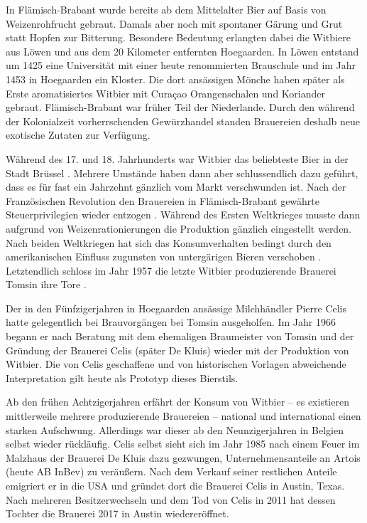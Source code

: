 \documentclass[a4paper,parskip=half]{scrartcl}
\begin{document}
In Flämisch-Brabant wurde bereits ab dem Mittelalter Bier auf
Basis von Weizenrohfrucht gebraut. Damals aber noch mit
spontaner Gärung und Grut statt Hopfen zur Bitterung.
Besondere Bedeutung erlangten dabei die Witbiere aus Löwen
und aus dem 20 Kilometer entfernten Hoegaarden. In Löwen
entstand um 1425 eine Universität mit einer heute renommierten Brauschule
und im Jahr 1453 in Hoegaarden ein Kloster. Die dort ansässigen
Mönche haben später als Erste aromatisiertes Witbier mit
Curaçao Orangenschalen und Koriander gebraut. Flämisch-Brabant war
früher Teil der Niederlande. Durch den während der
Kolonialzeit vorherrschenden Gewürzhandel standen
Brauereien deshalb neue exotische Zutaten zur Verfügung.
\parencite[1,4]{Strottner1999}

Während des 17. und 18. Jahrhunderts war Witbier das beliebteste Bier
in der Stadt Brüssel \parencite{Zainasheff2007}.
Mehrere Umstände haben dann aber schlussendlich dazu geführt, dass
es für fast ein Jahrzehnt gänzlich vom Markt verschwunden ist.
Nach der Französischen Revolution den Brauereien in
Flämisch-Brabant gewährte Steuerprivilegien wieder entzogen
\parencite[44]{Roncoroni2018}. Während des Ersten Weltkrieges
musste dann aufgrund von Weizenrationierungen die Produktion gänzlich
eingestellt werden. Nach beiden Weltkriegen hat sich
das Konsumverhalten bedingt durch den amerikanischen
Einfluss zugunsten von untergärigen Bieren verschoben \parencite[4]{Strottner1999}. Letztendlich schloss im Jahr 1957 die letzte
Witbier produzierende Brauerei Tomsin ihre Tore \parencite[44]{Roncoroni2018}.

Der in den Fünfzigerjahren in Hoegaarden ansässige Milchhändler Pierre
Celis hatte gelegentlich bei Brauvorgängen bei Tomsin ausgeholfen. Im
Jahr 1966 begann er nach Beratung mit dem ehemaligen
Braumeister von Tomsin und der Gründung der Brauerei Celis
(später De Kluis) wieder mit der Produktion von Witbier. Die von
Celis geschaffene und von historischen Vorlagen abweichende Interpretation
gilt heute als Prototyp dieses Bierstils.
\parencite[37,49]{Hieronymus2010} 

Ab den frühen Achtzigerjahren erfährt der Konsum von Witbier – es
existieren mittlerweile mehrere produzierende Brauereien – national und
international einen starken Aufschwung. Allerdings war dieser
ab den Neunzigerjahren in Belgien selbst wieder rückläufig.
Celis selbst sieht sich im Jahr 1985 nach einem Feuer im Malzhaus der Brauerei
De Kluis dazu gezwungen, Unternehmensanteile an Artois (heute
AB InBev) zu veräußern. Nach dem Verkauf seiner restlichen Anteile
emigriert er in die USA und gründet dort die Brauerei Celis in Austin,
Texas. Nach mehreren Besitzerwechseln und dem Tod von Celis in 2011
hat dessen Tochter die Brauerei 2017 in Austin wiedereröffnet.
\parencites[1]{Strottner1999}[37,49]{Hieronymus2010}{Meewes2017}
\end{document}
